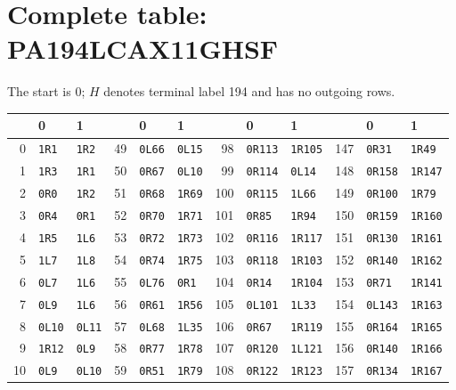 \section{Complete table: PA194LCAX11GHSF}
\label{tab:PA194LCAX11GHSF}
The start is 0; $H$ denotes terminal label 194 and has no outgoing rows.
\begin{center}\small\setlength{\tabcolsep}{4pt}
\begin{tabular}{rll@{\qquad}rll@{\qquad}rll@{\qquad}rll}
\toprule
 & 0 & 1 & & 0 & 1 & & 0 & 1 & & 0 & 1\\
\midrule
0 & \texttt{1R1} & \texttt{1R2} & 49 & \texttt{0L66} & \texttt{0L15} & 98 & \texttt{0R113} & \texttt{1R105} & 147 & \texttt{0R31} & \texttt{1R49}\\
1 & \texttt{1R3} & \texttt{1R1} & 50 & \texttt{0R67} & \texttt{0L10} & 99 & \texttt{0R114} & \texttt{0L14} & 148 & \texttt{0R158} & \texttt{1R147}\\
2 & \texttt{0R0} & \texttt{1R2} & 51 & \texttt{0R68} & \texttt{1R69} & 100 & \texttt{0R115} & \texttt{1L66} & 149 & \texttt{0R100} & \texttt{1R79}\\
3 & \texttt{0R4} & \texttt{0R1} & 52 & \texttt{0R70} & \texttt{1R71} & 101 & \texttt{0R85} & \texttt{1R94} & 150 & \texttt{0R159} & \texttt{1R160}\\
4 & \texttt{1R5} & \texttt{1L6} & 53 & \texttt{0R72} & \texttt{1R73} & 102 & \texttt{0R116} & \texttt{1R117} & 151 & \texttt{0R130} & \texttt{1R161}\\
5 & \texttt{1L7} & \texttt{1L8} & 54 & \texttt{0R74} & \texttt{1R75} & 103 & \texttt{0R118} & \texttt{1R103} & 152 & \texttt{0R140} & \texttt{1R162}\\
6 & \texttt{0L7} & \texttt{1L6} & 55 & \texttt{0L76} & \texttt{0R1} & 104 & \texttt{0R14} & \texttt{1R104} & 153 & \texttt{0R71} & \texttt{1R141}\\
7 & \texttt{0L9} & \texttt{1L6} & 56 & \texttt{0R61} & \texttt{1R56} & 105 & \texttt{0L101} & \texttt{1L33} & 154 & \texttt{0L143} & \texttt{1R163}\\
8 & \texttt{0L10} & \texttt{0L11} & 57 & \texttt{0L68} & \texttt{1L35} & 106 & \texttt{0R67} & \texttt{1R119} & 155 & \texttt{0R164} & \texttt{1R165}\\
9 & \texttt{1R12} & \texttt{0L9} & 58 & \texttt{0R77} & \texttt{1R78} & 107 & \texttt{0R120} & \texttt{1L121} & 156 & \texttt{0R140} & \texttt{1R166}\\
10 & \texttt{0L9} & \texttt{0L10} & 59 & \texttt{0R51} & \texttt{1R79} & 108 & \texttt{0R122} & \texttt{1R123} & 157 & \texttt{0R134} & \texttt{1R167}\\

\end{tabular}
\end{center}
